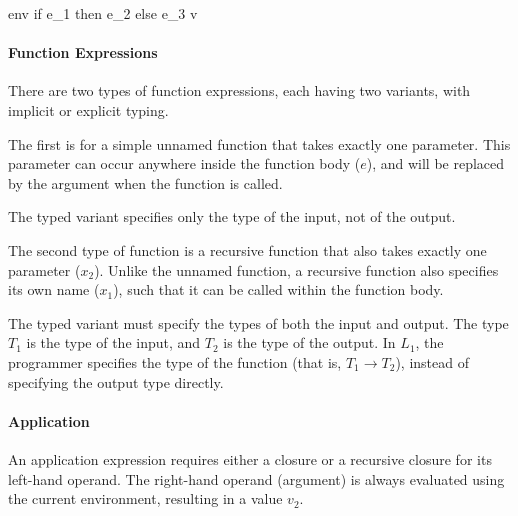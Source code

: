 \documentclass{article}
\begin{document}
	{\mbox{env} \vdash if \; e_1\; then \; e_2 \; else \; e_3 \Downarrow v}
	
\paragraph{Function Expressions}

There are two types of function expressions, each having two variants, with implicit or explicit typing.

\smallskip

The first is for a simple unnamed function that takes exactly one parameter.
This parameter can occur anywhere inside the function body ($e$), and will be replaced by the argument when the function is called.

The typed variant specifies only the type of the input, not of the output.


	
The second type of function is a recursive function that also takes exactly one parameter ($x_2$).
Unlike the unnamed function, a recursive function also specifies its own name ($x_1$), such that it can be called within the function body.

The typed variant must specify the types of both the input and output.
The type $T_1$ is the type of the input, and $T_2$ is the type of the output.
In $L_1$, the programmer specifies the type of the function (that is, $T_1 \rightarrow T_2$), instead of specifying the output type directly.
	

	
\paragraph{Application}
An application expression requires either a closure or a recursive closure for its left-hand operand.
The right-hand operand (argument) is always evaluated using the current environment, resulting in a value $v_2$.
\end{document}
